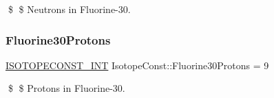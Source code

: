 \$ \$ Neutrons in Fluorine-\/30. \mbox{\label{group___isotope_const-_fluorine-_f30_ga4e4f79e7317033e610b3343291ec93bf}} 
\subsubsection{\texorpdfstring{Fluorine30\+Protons}{Fluorine30Protons}}
{\footnotesize\ttfamily \mbox{\hyperlink{group___isotope_const-_macros_ga5f18360b3e99483a35c32d789e62621c}{I\+S\+O\+T\+O\+P\+E\+C\+O\+N\+S\+T\+\_\+\+I\+NT}} Isotope\+Const\+::\+Fluorine30\+Protons = 9}

\$ \$ Protons in Fluorine-\/30. 